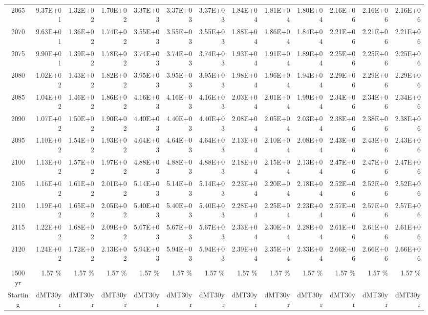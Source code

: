 \documentclass{article}
\begin{document}
\begin{table}
\begin{tabular}{crrr|rrr|rrr|rrr}
2065     & 9.37E+01 & 1.32E+02 & 1.70E+02 & 3.37E+03 & 3.37E+03 & 3.37E+03 & 1.84E+04 & 1.81E+04 & 1.80E+04 & 2.16E+06 & 2.16E+06 & 2.16E+06 \\
2070     & 9.63E+01 & 1.36E+02 & 1.74E+02 & 3.55E+03 & 3.55E+03 & 3.55E+03 & 1.88E+04 & 1.86E+04 & 1.84E+04 & 2.21E+06 & 2.21E+06 & 2.21E+06 \\
2075     & 9.90E+01 & 1.39E+02 & 1.78E+02 & 3.74E+03 & 3.74E+03 & 3.74E+03 & 1.93E+04 & 1.91E+04 & 1.89E+04 & 2.25E+06 & 2.25E+06 & 2.25E+06 \\
2080     & 1.02E+02 & 1.43E+02 & 1.82E+02 & 3.95E+03 & 3.95E+03 & 3.95E+03 & 1.98E+04 & 1.96E+04 & 1.94E+04 & 2.29E+06 & 2.29E+06 & 2.29E+06 \\
2085     & 1.04E+02 & 1.46E+02 & 1.86E+02 & 4.16E+03 & 4.16E+03 & 4.16E+03 & 2.03E+04 & 2.01E+04 & 1.99E+04 & 2.34E+06 & 2.34E+06 & 2.34E+06 \\
2090     & 1.07E+02 & 1.50E+02 & 1.90E+02 & 4.40E+03 & 4.40E+03 & 4.40E+03 & 2.08E+04 & 2.05E+04 & 2.03E+04 & 2.38E+06 & 2.38E+06 & 2.38E+06 \\
2095     & 1.10E+02 & 1.54E+02 & 1.93E+02 & 4.64E+03 & 4.64E+03 & 4.64E+03 & 2.13E+04 & 2.10E+04 & 2.08E+04 & 2.43E+06 & 2.43E+06 & 2.43E+06 \\
2100     & 1.13E+02 & 1.57E+02 & 1.97E+02 & 4.88E+03 & 4.88E+03 & 4.88E+03 & 2.18E+04 & 2.15E+04 & 2.13E+04 & 2.47E+06 & 2.47E+06 & 2.47E+06 \\
2105     & 1.16E+02 & 1.61E+02 & 2.01E+02 & 5.14E+03 & 5.14E+03 & 5.14E+03 & 2.23E+04 & 2.20E+04 & 2.18E+04 & 2.52E+06 & 2.52E+06 & 2.52E+06 \\
2110     & 1.19E+02 & 1.65E+02 & 2.05E+02 & 5.40E+03 & 5.40E+03 & 5.40E+03 & 2.28E+04 & 2.25E+04 & 2.23E+04 & 2.57E+06 & 2.57E+06 & 2.57E+06 \\
2115     & 1.22E+02 & 1.68E+02 & 2.09E+02 & 5.67E+03 & 5.67E+03 & 5.67E+03 & 2.33E+04 & 2.30E+04 & 2.28E+04 & 2.61E+06 & 2.61E+06 & 2.61E+06 \\
2120     & 1.24E+02 & 1.72E+02 & 2.13E+02 & 5.94E+03 & 5.94E+03 & 5.94E+03 & 2.39E+04 & 2.35E+04 & 2.33E+04 & 2.66E+06 & 2.66E+06 & 2.66E+06 \\
         &          &          &          &          &          &          &          &          &          &          &          &          \\ \hline
1500 yr  & 1.57 \%  & 1.57 \%  & 1.57 \%  & 1.57 \%  & 1.57 \%  & 1.57 \%  & 1.57 \%  & 1.57 \%  & 1.57 \%  & 1.57 \%  & 1.57 \%  & 1.57 \%  \\
Starting & dMT30yr  & dMT30yr  & dMT30yr  & dMT30yr  & dMT30yr  & dMT30yr  & dMT30yr  & dMT30yr  & dMT30yr  & dMT30yr  & dMT30yr  & dMT30yr  \\

\end{tabular}
\end{table}
\end{document}
